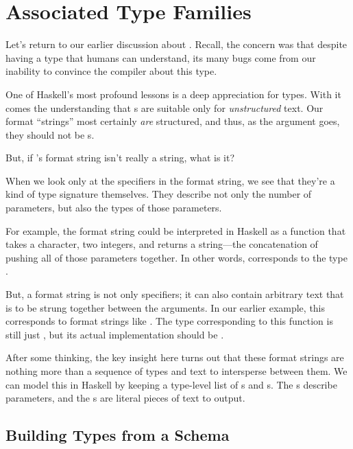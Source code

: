 \documentclass[book.tex]{subfiles}
\begin{document}
\chapter{Associated Type Families}

Let's return to our earlier discussion about . Recall, the concern
was that despite  having a type that humans can understand, its many
bugs come from our inability to convince the compiler about this type.

One of Haskell's most profound lessons is a deep appreciation for types. With it
comes the understanding that s are suitable only for
\emph{unstructured} text. Our format ``strings'' most certainly \emph{are}
structured, and thus, as the argument goes, they should not be s.

But, if 's format string isn't really a string, what is it?

When we look only at the specifiers in the format string, we see that they're a
kind of type signature themselves. They describe not only the number of
parameters, but also the types of those parameters.

For example, the format string  could be interpreted in
Haskell as a function that takes a character, two integers, and returns a
string---the concatenation of pushing all of those parameters together. In
other words,  corresponds to the type .

But, a format string is not only specifiers; it can also contain arbitrary text
that is to be strung together between the arguments. In our earlier example,
this corresponds to format strings like . The type
corresponding to this function is still just , but its actual
implementation should be .

After some thinking, the key insight here turns out that these format strings
are nothing more than a sequence of types and text to intersperse between them.
We can model this in Haskell by keeping a type-level list of s and
s. The s describe parameters, and the s are
literal pieces of text to output.


\section{Building Types from a Schema}
\end{document}
